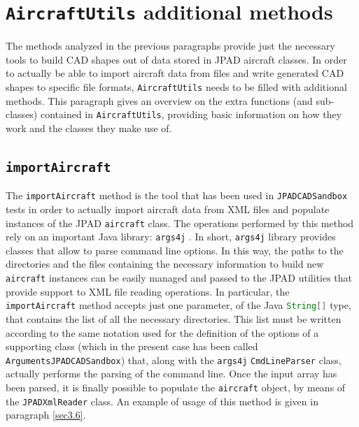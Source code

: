 \section{\texttt{AircraftUtils} additional methods}
\label{sec3.5}
The methods analyzed in the previous paragraphs provide just the necessary tools to build \gls{CAD} shapes out of data stored in \gls{JPAD} aircraft classes. In order to actually be able to import aircraft data from files and write generated \gls{CAD} shapes to specific file formats, \lstinline[language=Java]!AircraftUtils! needs to be filled with additional methods. This paragraph gives an overview on the extra functions (and sub-classes) contained in \lstinline[language=Java]!AircraftUtils!, providing basic information on how they work and the classes they make use of.

\subsection{\texttt{importAircraft}}
\label{sec3.5.1}

The \lstinline[language=Java]!importAircraft! method is the tool that has been used in \lstinline[language=Java]!JPADCADSandbox! tests in order to actually import aircraft data from XML files and populate instances of the \gls{JPAD} \lstinline[language=Java]!aircraft! class. The operations performed by this method rely on an important Java library: \lstinline[language=Java]!args4j! \cite{args4j}. In short, \lstinline[language=Java]!args4j! library provides classes that allow to parse command line options. In this way, the paths to the directories and the files containing the necessary information to build new \lstinline[language=Java]!aircraft! instances can be easily managed and passed to the \gls{JPAD} utilities that provide support to XML file reading operations. In particular, the \lstinline[language=Java]!importAircraft! method accepts just one parameter, of the Java \lstinline[language=Java]!String[]! type, that contains the list of all the necessary directories. This list must be written according to the same notation used for the definition of the options of a supporting class (which in the present case has been called \lstinline[language=Java]!ArgumentsJPADCADSandbox!) that, along with the \lstinline[language=Java]!args4j! \lstinline[language=Java]!CmdLineParser! class, actually performs the parsing of the command line. Once the input array has been parsed, it is finally possible to populate the \lstinline[language=Java]!aircraft! object, by means of the \lstinline[language=Java]!JPADXmlReader! class. An example of usage of this method is given in paragraph \ref{sec3.6}.

